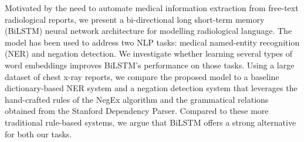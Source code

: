 Motivated by the need to automate medical information extraction from free-text radiological reports, we present a bi-directional long short-term memory (BiLSTM) neural network architecture for modelling radiological language. The model has been used to address two NLP tasks: medical named-entity recognition (NER) and negation detection. We investigate whether learning several types of word embeddings improves BiLSTM's performance on those tasks. Using a large dataset of chest x-ray reports, we compare the proposed model to a baseline dictionary-based NER system and a negation detection system that leverages the hand-crafted rules of the NegEx algorithm and the grammatical relations obtained from the Stanford Dependency Parser. Compared to these more traditional rule-based systems, we argue that BiLSTM offers a strong alternative for both our tasks.
